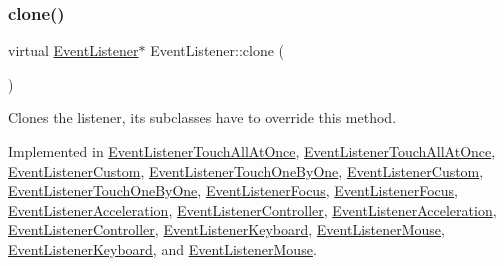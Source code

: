 \mbox{\label{classEventListener_a8707b41e85031f08e48def3584d51bc0}} 
\subsubsection{\texorpdfstring{clone()}{clone()}\hspace{0.1cm}{\footnotesize\ttfamily [2/2]}}
{\footnotesize\ttfamily virtual \hyperlink{classEventListener}{Event\+Listener}$\ast$ Event\+Listener\+::clone (\begin{DoxyParamCaption}{ }\end{DoxyParamCaption})\hspace{0.3cm}{\ttfamily [pure virtual]}}

Clones the listener, its subclasses have to override this method. 

Implemented in \hyperlink{classEventListenerTouchAllAtOnce_a0b2fd9403e7ea1548ad3ccc54270df4f}{Event\+Listener\+Touch\+All\+At\+Once}, \hyperlink{classEventListenerTouchAllAtOnce_ab746dbbce44cceb3916ba7a81be36ede}{Event\+Listener\+Touch\+All\+At\+Once}, \hyperlink{classEventListenerCustom_a2b1c47443d2288b0b4a5b53fe35914ba}{Event\+Listener\+Custom}, \hyperlink{classEventListenerTouchOneByOne_aeb19046f96745ff3cb49ba4ee92a8335}{Event\+Listener\+Touch\+One\+By\+One}, \hyperlink{classEventListenerCustom_a9a8bffb7f8169c9ca32aba3bf4cd74bc}{Event\+Listener\+Custom}, \hyperlink{classEventListenerTouchOneByOne_ab6fd6db6eefeb57abf3f0aca46d0b5c8}{Event\+Listener\+Touch\+One\+By\+One}, \hyperlink{classEventListenerFocus_a947808a74abc88554f23668cebff1a7d}{Event\+Listener\+Focus}, \hyperlink{classEventListenerFocus_a0c1533bf324759353479a453ac10981f}{Event\+Listener\+Focus}, \hyperlink{classEventListenerAcceleration_aaa4f9b30d3b8514511ffe2126c92722d}{Event\+Listener\+Acceleration}, \hyperlink{classEventListenerController_a10c944bc699aac977f85d8b8bdc65e15}{Event\+Listener\+Controller}, \hyperlink{classEventListenerAcceleration_afb99c69338b86b1af2ae8d564e229b54}{Event\+Listener\+Acceleration}, \hyperlink{classEventListenerController_ae4960229437589034e72b5c3dbb4a5c7}{Event\+Listener\+Controller}, \hyperlink{classEventListenerKeyboard_a6597435f0ccb2d981201b1c2de867f93}{Event\+Listener\+Keyboard}, \hyperlink{classEventListenerMouse_ae4c910ce9d885e1f1efc7cd380bee94a}{Event\+Listener\+Mouse}, \hyperlink{classEventListenerKeyboard_afef5b79568f3b28f9f1bacdfe90067f5}{Event\+Listener\+Keyboard}, and \hyperlink{classEventListenerMouse_a7696b08cd79fcc6ef6bc165c8e0bbf81}{Event\+Listener\+Mouse}.

